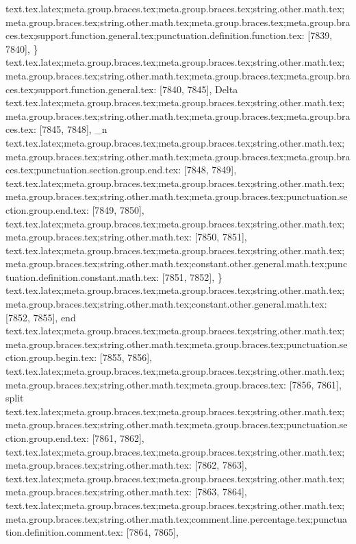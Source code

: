 {{{{{{{{{{{{{{{{{{{{{{{{{{{{{{{{{{{{{{{{{{{{{{{{{{{{{{{{{{{{{{{{{{{{{{{{{{{{{{{{{{{{{{{{{{{{{{{{{{{{{{{{{{{{{{{{{{{{{{{{{{{{{{{{{{{{{{{{{{{{{{{{{{{{{{{{{{{{{{{{{{{{{{{{{{{{{{{{{{{{{{{{{{{{{{{{{{{{{{{{{{{{{{{{{{{{{{{{{{{{{{{{{{{{{{{text.tex.latex;meta.group.braces.tex;meta.group.braces.tex;string.other.math.tex;meta.group.braces.tex;string.other.math.tex;meta.group.braces.tex;meta.group.braces.tex;support.function.general.tex;punctuation.definition.function.tex: [7839, 7840], {\}
text.tex.latex;meta.group.braces.tex;meta.group.braces.tex;string.other.math.tex;meta.group.braces.tex;string.other.math.tex;meta.group.braces.tex;meta.group.braces.tex;support.function.general.tex: [7840, 7845], {Delta}
text.tex.latex;meta.group.braces.tex;meta.group.braces.tex;string.other.math.tex;meta.group.braces.tex;string.other.math.tex;meta.group.braces.tex;meta.group.braces.tex: [7845, 7848], {_n }
text.tex.latex;meta.group.braces.tex;meta.group.braces.tex;string.other.math.tex;meta.group.braces.tex;string.other.math.tex;meta.group.braces.tex;meta.group.braces.tex;punctuation.section.group.end.tex: [7848, 7849], {}}
text.tex.latex;meta.group.braces.tex;meta.group.braces.tex;string.other.math.tex;meta.group.braces.tex;string.other.math.tex;meta.group.braces.tex;punctuation.section.group.end.tex: [7849, 7850], {}}
text.tex.latex;meta.group.braces.tex;meta.group.braces.tex;string.other.math.tex;meta.group.braces.tex;string.other.math.tex: [7850, 7851], {
}
text.tex.latex;meta.group.braces.tex;meta.group.braces.tex;string.other.math.tex;meta.group.braces.tex;string.other.math.tex;constant.other.general.math.tex;punctuation.definition.constant.math.tex: [7851, 7852], {\}
text.tex.latex;meta.group.braces.tex;meta.group.braces.tex;string.other.math.tex;meta.group.braces.tex;string.other.math.tex;constant.other.general.math.tex: [7852, 7855], {end}
text.tex.latex;meta.group.braces.tex;meta.group.braces.tex;string.other.math.tex;meta.group.braces.tex;string.other.math.tex;meta.group.braces.tex;punctuation.section.group.begin.tex: [7855, 7856], {{}
text.tex.latex;meta.group.braces.tex;meta.group.braces.tex;string.other.math.tex;meta.group.braces.tex;string.other.math.tex;meta.group.braces.tex: [7856, 7861], {split}
text.tex.latex;meta.group.braces.tex;meta.group.braces.tex;string.other.math.tex;meta.group.braces.tex;string.other.math.tex;meta.group.braces.tex;punctuation.section.group.end.tex: [7861, 7862], {}}
text.tex.latex;meta.group.braces.tex;meta.group.braces.tex;string.other.math.tex;meta.group.braces.tex;string.other.math.tex: [7862, 7863], {
}
text.tex.latex;meta.group.braces.tex;meta.group.braces.tex;string.other.math.tex;meta.group.braces.tex;string.other.math.tex: [7863, 7864], {
}
text.tex.latex;meta.group.braces.tex;meta.group.braces.tex;string.other.math.tex;meta.group.braces.tex;string.other.math.tex;comment.line.percentage.tex;punctuation.definition.comment.tex: [7864, 7865], {%
}}}}}}}}}}}}}}}}}}}}}}}}}}}}}}}}}}}}}}}}}}}}}}}}}}}}}}}}}}}}}}}}}}}}}}}}}}}}}}}}}}}}}}}}}}}}}}}}}}}}}}}}}}}}}}}}}}}}}}}}}}}}}}}}}}}}}}}}}}}}}}}}}}}}}}}}}}}}}}}}}}}}}}}}}}}}}}}}}}}}}}}}}}}}}}}}}}}}}}}}}}}}}}}}}}}}}}}}}}}}}}}}}}}}}}}}
